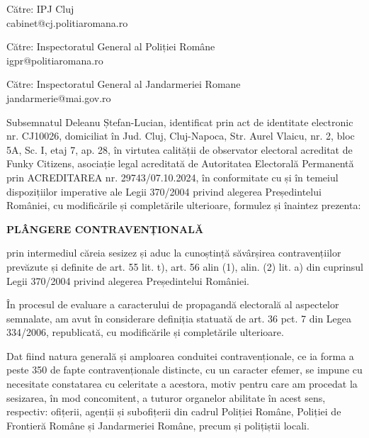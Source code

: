 \documentclass[a4paper,12pt]{article}
\begin{document}
\begin{flushleft}
    \normalsize
    Către: IPJ Cluj\\
    cabinet@cj.politiaromana.ro\\
\end{flushleft}

\begin{flushleft}
    \normalsize
    Către: Inspectoratul General al Poliției Române\\
    igpr@politiaromana.ro\\
\end{flushleft}

\begin{flushleft}
    \normalsize
    Către: Inspectoratul General al Jandarmeriei Romane\\
    jandarmerie@mai.gov.ro\\
\end{flushleft}

\vspace{1cm}

Subsemnatul Deleanu Ștefan-Lucian, identificat prin act de identitate electronic nr. CJ10026, domiciliat în Jud. Cluj, Cluj-Napoca, Str. Aurel Vlaicu, nr. 2, bloc 5A, Sc. I, etaj 7, ap. 28, în virtutea calității de observator electoral acreditat de Funky Citizens, asociație legal acreditată de Autoritatea Electorală Permanentă prin ACREDITAREA nr. 29743/07.10.2024, în conformitate cu și în temeiul dispozițiilor imperative ale Legii 370/2004 privind alegerea Președintelui României, cu modificările și completările ulterioare, formulez și înaintez prezenta:

\vspace{0.5cm}
\begin{center}
\textbf{\Large PLÂNGERE CONTRAVENȚIONALĂ}
\end{center}
\vspace{0.5cm}

prin intermediul căreia sesizez și aduc la cunoștință săvârșirea contravențiilor prevăzute și definite de art. 55 lit. t), art. 56 alin (1), alin. (2) lit. a) din cuprinsul Legii 370/2004 privind alegerea Președintelui României.

În procesul de evaluare a caracterului de propagandă electorală al aspectelor semnalate, am avut în considerare definiția statuată de art. 36 pct. 7 din Legea 334/2006, republicată, cu modificările și completările ulterioare.

Dat fiind natura generală și amploarea conduitei contravenționale, ce ia forma a peste 350 de fapte contravenționale distincte, cu un caracter efemer, se impune cu necesitate constatarea cu celeritate a acestora, motiv pentru care am procedat la sesizarea, în mod concomitent, a tuturor organelor abilitate în acest sens, respectiv: ofițerii, agenții și subofițerii din cadrul Poliției Române, Poliției de Frontieră Române și Jandarmeriei Române, precum și polițiștii locali.
\end{document}
